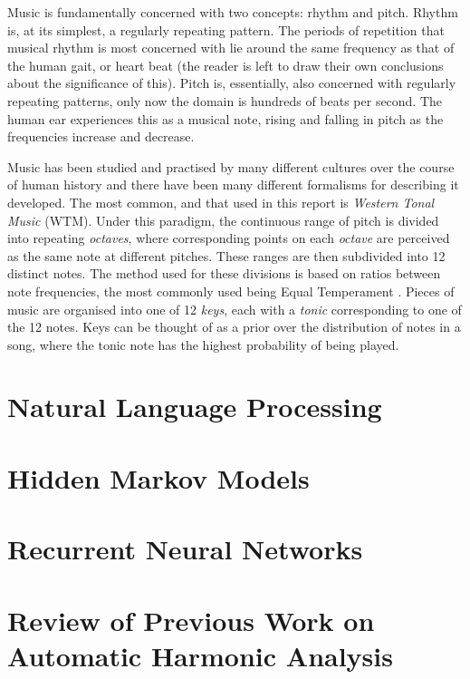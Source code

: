 \documentclass[bsc,singlespacing,logo, parskip, deptreport]{infthesis}
\begin{document}
Music is fundamentally concerned with two concepts: rhythm and pitch. Rhythm is, at its simplest, a regularly repeating pattern. The periods of repetition that musical rhythm is most concerned with lie around the same frequency as that of the human gait, or heart beat (the reader is left to draw their own conclusions about the significance of this). Pitch is, essentially, also concerned with regularly repeating patterns, only now the domain is hundreds of beats per second. The human ear experiences this as a musical note, rising and falling in pitch as the frequencies increase and decrease.

Music has been studied and practised by many different cultures over the course of human history and there have been many different formalisms for describing it developed. The most common, and that used in this report is {\em Western Tonal Music} (WTM). Under this paradigm, the continuous range of pitch is divided into repeating {\em octaves}, where corresponding points on each {\em octave} are perceived as the same note at different pitches. These ranges are then subdivided into 12 distinct notes. The method used for these divisions is based on ratios between note frequencies, the most commonly used being Equal Temperament \cite{regener1973pitch}. Pieces of music are organised into one of 12 {\em keys}, each with a {\em tonic} corresponding to one of the 12 notes. Keys can be thought of as a prior over the distribution of notes in a song, where the tonic note has the highest probability of being played.


\section{Natural Language Processing}

\section{Hidden Markov Models}

\section{Recurrent Neural Networks}

\section{Review of Previous Work on Automatic Harmonic Analysis}


\end{document}
